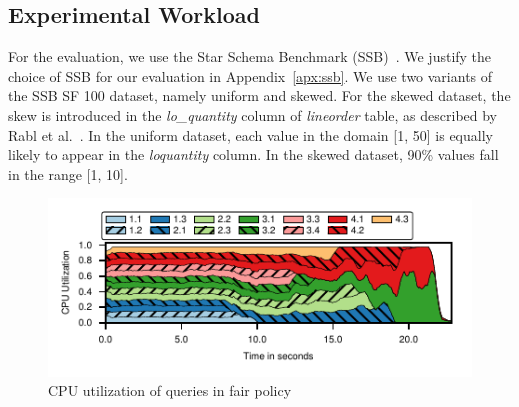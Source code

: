 
\subsection{Experimental Workload}\label{ssec:workload}
For the evaluation, we use the Star Schema Benchmark (SSB)~\cite{ssb}. 
We justify the choice of SSB for our evaluation in Appendix~\ref{apx:ssb}.
We use two variants of the SSB SF 100 dataset, namely uniform and skewed. 
For the skewed dataset, the skew is introduced in the \textit{lo\_quantity} column of \textit{lineorder} table, as described by Rabl et al.~\cite{DBLP:conf/wosp/RablPJOO13}.
In the uniform dataset, each value in the domain [1, 50] is equally likely to appear in the \textit{lo\textunderscore quantity} column.
In the skewed dataset, 90\% values fall in the range [1, 10]. 

\begin{figure}[t]
	\centering
	\includegraphics[width=\columnwidth]{policy/figures/ssb-all-uniform-fair-cpu-util.pdf}
	\caption{CPU utilization of queries in fair policy}
	\label{fig:fair-cpu-util}
\end{figure}


